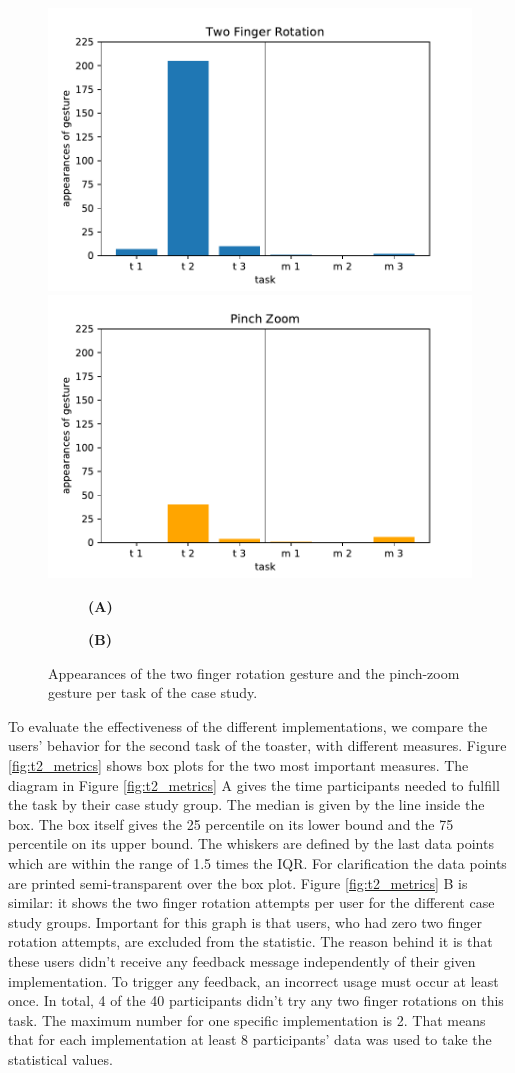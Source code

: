 \documentclass[11pt, a4paper]{article}
\begin{document}
			\begin{figure}[H]
				\centering
				\includegraphics[width=.49\textwidth]{img/plot/plot_tfr.pdf}
				\includegraphics[width=.49\textwidth]{img/plot/plot_pz.pdf}
				\begin{subfigure}[t]{.49\textwidth}\centering
					\textbf{(A)}
				\end{subfigure}
				\begin{subfigure}[t]{.49\textwidth}\centering
					\textbf{(B)}
				\end{subfigure}
				\caption{Appearances of the two finger rotation gesture and the pinch-zoom gesture per task of the case study. }
				\label{fig:tfr_v_pz}
			\end{figure}

			To evaluate the effectiveness of the different implementations, we compare the users' behavior for the second task of the toaster, with different measures. Figure \ref{fig:t2_metrics} shows box plots for the two most important measures. The diagram in Figure \ref{fig:t2_metrics} A gives the time participants needed to fulfill the task by their case study group. The median is given by the line inside the box. The box itself gives the 25 percentile on its lower bound and the 75 percentile on its upper bound. The whiskers are defined by the last data points which are within the range of 1.5 times the IQR. For clarification the data points are printed semi-transparent over the box plot. Figure \ref{fig:t2_metrics} B is similar: it shows the two finger rotation attempts per user for the different case study groups. Important for this graph is that users, who had zero two finger rotation attempts, are excluded from the statistic. The reason behind it is that these users didn't receive any feedback message independently of their given implementation. To trigger any feedback, an incorrect usage must occur at least once. In total, 4 of the 40 participants didn't try any two finger rotations on this task. The maximum number for one specific implementation is 2. That means that for each implementation at least 8 participants' data was used to take the statistical values.
\end{document}

